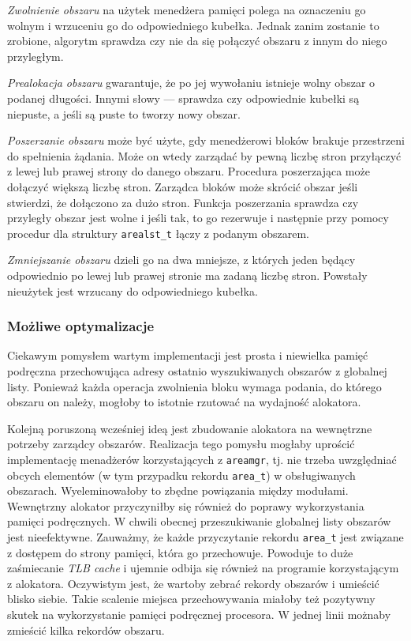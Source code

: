 \documentclass[12pt,a4paper,titlepage,twoside]{mwart}
\begin{document}
\textit{Zwolnienie obszaru} na użytek menedżera pamięci polega na oznaczeniu go
wolnym i wrzuceniu go do odpowiedniego kubełka. Jednak zanim zostanie to zrobione,
algorytm sprawdza czy nie da się połączyć obszaru z innym do niego przyległym.

\textit{Prealokacja obszaru} gwarantuje, że po jej wywołaniu istnieje wolny
obszar o podanej długości. Innymi słowy --- sprawdza czy odpowiednie kubełki są
niepuste, a jeśli są puste to tworzy nowy obszar.

\textit{Poszerzanie obszaru} może być użyte, gdy menedżerowi bloków brakuje
przestrzeni do spełnienia żądania. Może on wtedy zarządać by pewną liczbę stron
przyłączyć z lewej lub prawej strony do danego obszaru. Procedura poszerzająca
może dołączyć większą liczbę stron. Zarządca bloków może skrócić obszar jeśli
stwierdzi, że dołączono za dużo stron. Funkcja poszerzania sprawdza czy
przyległy obszar jest wolne i jeśli tak, to go rezerwuje i następnie przy pomocy
procedur dla struktury \verb+arealst_t+ łączy z podanym obszarem.

\textit{Zmniejszanie obszaru} dzieli go na dwa mniejsze, z których jeden będący
odpowiednio po lewej lub prawej stronie ma zadaną liczbę stron. Powstały
nieużytek jest wrzucany do odpowiedniego kubełka.

\subsubsection{Możliwe optymalizacje}

Ciekawym pomysłem wartym implementacji jest prosta i niewielka pamięć podręczna
przechowująca adresy ostatnio wyszukiwanych obszarów z globalnej listy.
Ponieważ każda operacja zwolnienia bloku wymaga podania, do którego obszaru on
należy, mogłoby to istotnie rzutować na wydajność alokatora.

Kolejną poruszoną wcześniej ideą jest zbudowanie alokatora na wewnętrzne
potrzeby zarządcy obszarów. Realizacja tego pomysłu mogłaby uprościć
implementację menadżerów korzystających z \texttt{areamgr}, tj. nie trzeba
uwzględniać obcych elementów (w tym przypadku rekordu \texttt{area\_t}) w
obsługiwanych obszarach. Wyeleminowałoby to zbędne powiązania między modułami.
Wewnętrzny alokator przyczyniłby się również do poprawy wykorzystania pamięci
podręcznych. W chwili obecnej przeszukiwanie globalnej listy obszarów jest
nieefektywne. Zauważmy, że każde przyczytanie rekordu \texttt{area\_t} jest
związane z dostępem do strony pamięci, która go przechowuje. Powoduje to duże
zaśmiecanie \textit{TLB cache} i ujemnie odbija się również na programie
korzystającym z alokatora. Oczywistym jest, że wartoby zebrać rekordy obszarów
i umieścić blisko siebie. Takie scalenie miejsca przechowywania miałoby też
pozytywny skutek na wykorzystanie pamięci podręcznej procesora. W jednej linii
możnaby zmieścić kilka rekordów obszaru.
\end{document}

